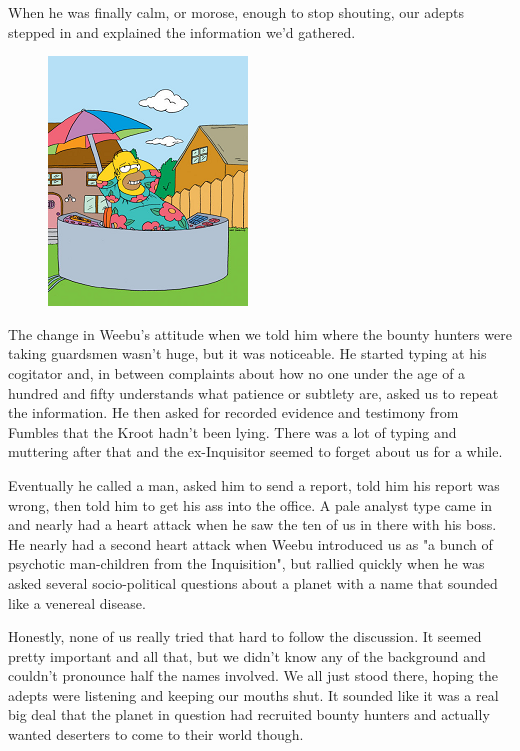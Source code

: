 When he was finally calm, or morose, enough to stop shouting, our adepts stepped in and explained the information we'd gathered.

\begin{figure}
	\begin{center}
		\includegraphics[width=\figwidth]{pics/10/31.png}
	\end{center}
\end{figure}
The change in Weebu's attitude when we told him where the bounty hunters were taking guardsmen wasn't huge, but it was noticeable. 
He started typing at his cogitator and, in between complaints about how no one under the age of a hundred and fifty understands what patience or subtlety are, asked us to repeat the information. 
He then asked for recorded evidence and testimony from Fumbles that the Kroot hadn't been lying. 
There was a lot of typing and muttering after that and the ex-Inquisitor seemed to forget about us for a while.

Eventually he called a man, asked him to send a report, told him his report was wrong, then told him to get his ass into the office. 
A pale analyst type came in and nearly had a heart attack when he saw the ten of us in there with his boss. 
He nearly had a second heart attack when Weebu introduced us as "a bunch of psychotic man-children from the Inquisition", but rallied quickly when he was asked several socio-political questions about a planet with a name that sounded like a venereal disease.

Honestly, none of us really tried that hard to follow the discussion. 
It seemed pretty important and all that, but we didn't know any of the background and couldn't pronounce half the names involved. 
We all just stood there, hoping the adepts were listening and keeping our mouths shut. 
It sounded like it was a real big deal that the planet in question had recruited bounty hunters and actually wanted deserters to come to their world though.

